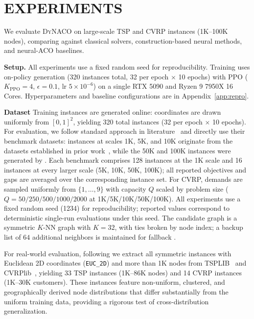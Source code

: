 \documentclass[sigconf,review]{acmart}
\newcommand{\DyNACO}{\textsc{DyNACO}}
\begin{document}
\section{EXPERIMENTS}
\label{sec:experiments}

We evaluate \DyNACO{} on large-scale TSP and CVRP instances (1K--100K nodes), comparing against classical solvers, construction-based neural methods, and neural-ACO baselines.


\smallskip\noindent\textbf{Setup.}
All experiments use a fixed random seed for reproducibility.
Training uses on-policy generation (320 instances total, 32 per epoch $\times$ 10 epochs) with PPO ($K_{\text{PPO}}{=}4$, $\epsilon{=}0.1$, lr $5{\times}10^{-6}$) on a single RTX 5090 and Ryzen 9 7950X 16 Cores.
Hyperparameters and baseline configurations are in Appendix~\ref{app:repro}.

\smallskip\noindent\textbf{Dataset}
Training instances are generated online: coordinates are drawn uniformly from $[0,1]^2$, yielding 320 total instances (32 per epoch $\times$ 10 epochs).
For evaluation, we follow standard approach in literature~\cite{attentionmodel, pomo, lehd, sil} and directly use their benchmark datasets: instances at scales 1K, 5K, and 10K originate from the datasets established in prior work~\cite{attentionmodel, pomo, lehd}, while the 50K and 100K instances were generated by \cite{sil}.
Each benchmark comprises 128 instances at the 1K scale and 16 instances at every larger scale (5K, 10K, 50K, 100K); all reported objectives and gaps are averaged over the corresponding instance set.
For CVRP, demands are sampled uniformly from $\{1,\ldots,9\}$ with capacity $Q$ scaled by problem size ($Q{=}50/250/500/1000/2000$ at 1K/5K/10K/50K/100K).
All experiments use a fixed random seed (1234) for reproducibility; reported values correspond to deterministic single-run evaluations under this seed.
The candidate graph is a symmetric $K$-NN graph with $K{=}32$, with ties broken by node index; a backup list of $64$ additional neighbors is maintained for fallback \cite{ACOTSP-MF}.

For real-world evaluation, following \cite{sil} we extract all symmetric instances with Euclidean 2D coordinates (\texttt{EUC\_2D}) and more than 1K nodes from TSPLIB~\cite{tsplib} and CVRPlib~\cite{cvrplib}, yielding 33 TSP instances (1K--86K nodes) and 14 CVRP instances (1K--30K customers).
These instances feature non-uniform, clustered, and geographically derived node distributions that differ substantially from the uniform training data, providing a rigorous test of cross-distribution generalization.
\end{document}
